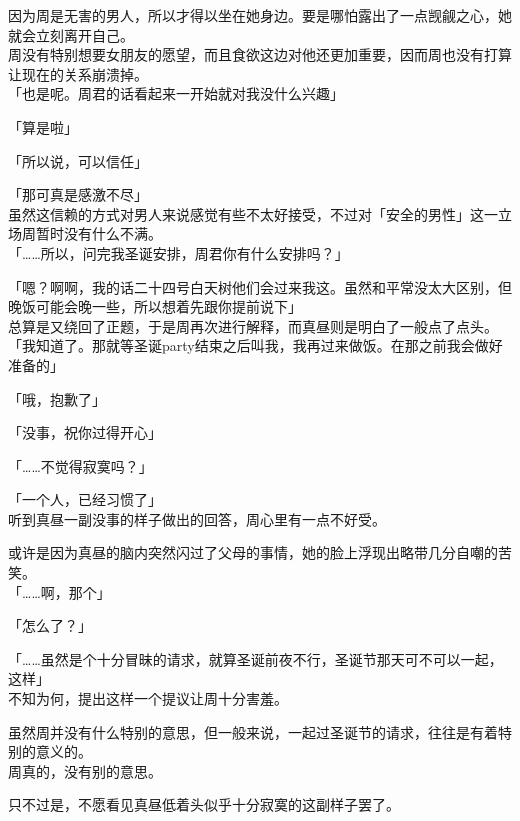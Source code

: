 因为周是无害的男人，所以才得以坐在她身边。要是哪怕露出了一点觊觎之心，她就会立刻离开自己。\\

周没有特别想要女朋友的愿望，而且食欲这边对他还更加重要，因而周也没有打算让现在的关系崩溃掉。\\

「也是呢。周君的话看起来一开始就对我没什么兴趣」

「算是啦」

「所以说，可以信任」

「那可真是感激不尽」\\

虽然这信赖的方式对男人来说感觉有些不太好接受，不过对「安全的男性」这一立场周暂时没有什么不满。\\

「……所以，问完我圣诞安排，周君你有什么安排吗？」

「嗯？啊啊，我的话二十四号白天树他们会过来我这。虽然和平常没太大区别，但晚饭可能会晚一些，所以想着先跟你提前说下」\\

总算是又绕回了正题，于是周再次进行解释，而真昼则是明白了一般点了点头。\\

「我知道了。那就等圣诞party结束之后叫我，我再过来做饭。在那之前我会做好准备的」

「哦，抱歉了」

「没事，祝你过得开心」

「……不觉得寂寞吗？」

「一个人，已经习惯了」\\

听到真昼一副没事的样子做出的回答，周心里有一点不好受。

或许是因为真昼的脑内突然闪过了父母的事情，她的脸上浮现出略带几分自嘲的苦笑。\\

「……啊，那个」

「怎么了？」

「……虽然是个十分冒昧的请求，就算圣诞前夜不行，圣诞节那天可不可以一起，这样」\\

不知为何，提出这样一个提议让周十分害羞。

虽然周并没有什么特别的意思，但一般来说，一起过圣诞节的请求，往往是有着特别的意义的。\\

周真的，没有别的意思。

只不过是，不愿看见真昼低着头似乎十分寂寞的这副样子罢了。\\

